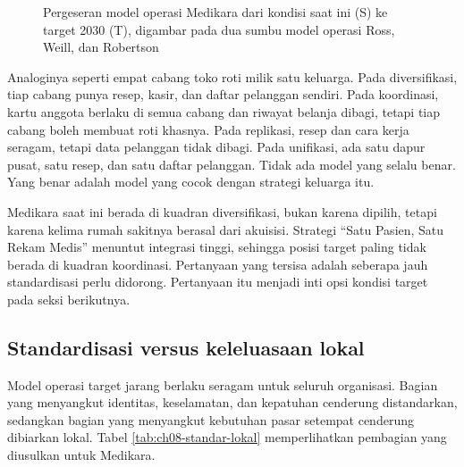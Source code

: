 \begin{figure}[!htb]
  \centering
  
  \caption{Pergeseran model operasi Medikara dari kondisi saat ini (S) ke target 2030 (T),
           digambar pada dua sumbu model operasi Ross, Weill, dan Robertson}
  \label{fig:ch08-model-operasi}
\end{figure}

Analoginya seperti empat cabang toko roti milik satu keluarga. Pada diversifikasi, tiap
cabang punya resep, kasir, dan daftar pelanggan sendiri. Pada koordinasi, kartu anggota
berlaku di semua cabang dan riwayat belanja dibagi, tetapi tiap cabang boleh membuat roti
khasnya. Pada replikasi, resep dan cara kerja seragam, tetapi data pelanggan tidak dibagi.
Pada unifikasi, ada satu dapur pusat, satu resep, dan satu daftar pelanggan. Tidak ada
model yang selalu benar. Yang benar adalah model yang cocok dengan strategi keluarga itu.

Medikara saat ini berada di kuadran diversifikasi, bukan karena dipilih, tetapi karena
kelima rumah sakitnya berasal dari akuisisi. Strategi ``Satu Pasien, Satu Rekam Medis''
menuntut integrasi tinggi, sehingga posisi target paling tidak berada di kuadran
koordinasi. Pertanyaan yang tersisa adalah seberapa jauh standardisasi perlu didorong.
Pertanyaan itu menjadi inti opsi kondisi target pada seksi berikutnya.

\subsection*{Standardisasi versus keleluasaan lokal}

Model operasi target jarang berlaku seragam untuk seluruh organisasi. Bagian yang
menyangkut identitas, keselamatan, dan kepatuhan cenderung distandarkan, sedangkan bagian
yang menyangkut kebutuhan pasar setempat cenderung dibiarkan lokal. Tabel
\ref{tab:ch08-standar-lokal} memperlihatkan pembagian yang diusulkan untuk Medikara.

